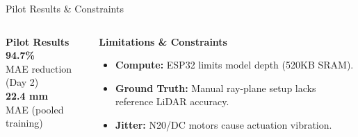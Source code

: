\documentclass[aspectratio=169]{beamer}
\begin{document}
\begin{frame}{Pilot Results \& Constraints}
    \vspace{0.2cm}
    \begin{columns}[t]
        \begin{center}
            {\large \bfseries Pilot Results} \\[0.2cm]
            {\Huge \bfseries \textcolor{successgreen}{94.7\%}} \\[0.1cm]
            {\footnotesize MAE reduction (Day 2)} \\[0.3cm]
            {\Huge \bfseries \textcolor{accent}{22.4 mm}} \\[0.1cm]
            {\footnotesize MAE (pooled training)}
        \end{center}
        
        \begin{center}
            {\large \bfseries Limitations \& Constraints} \\[0.2cm]
            \begin{itemize}
                \footnotesize
                \item \textbf{Compute:} ESP32 limits model depth (520KB SRAM).
                \item \textbf{Ground Truth:} Manual ray-plane setup lacks reference LiDAR accuracy.
                \item \textbf{Jitter:} N20/DC motors cause actuation vibration.
            \end{itemize}
        \end{center}
    \end{columns}
\end{frame}
\end{document}
